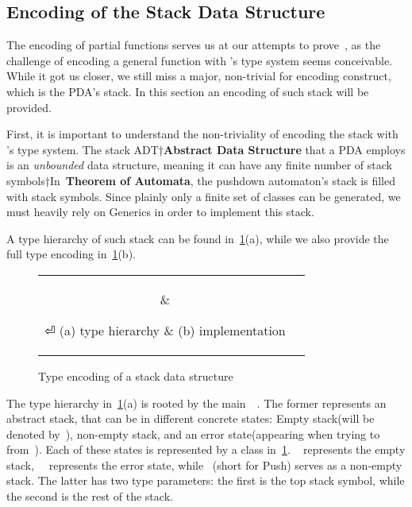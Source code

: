 \subsection{Encoding of the Stack Data Structure}
The encoding of partial functions serves us at our attempts to prove~,
  as the challenge of encoding a general function with \Java's type system seems conceivable.
While it got us closer, we still miss a major, non-trivial for encoding construct, 
  which is the PDA's stack.
In this section an encoding of such stack will be provided.

First, it is important to understand the non-triviality of encoding the stack with \Java's type system.
  The stack ADT†{\textbf{Abstract Data Structure}} that a PDA employs is an \emph{unbounded} data structure,
  meaning it can have any finite number of stack symbols†{In~\textbf{Theorem of Automata}, the pushdown automaton's stack is filled with stack symbols}.
Since plainly only a finite set of \Java classes can be generated, we must heavily rely on \Java Generics in order to
  implement this stack.

A type hierarchy of such stack can be found in~\cref{Figure:stack:encoding}(a), 
  while we also provide the full \Java type encoding in~\cref{Figure:stack:encoding}(b).

\begin{figure}[htb]
  \caption{\label{Figure:stack:encoding} Type encoding of a stack data structure} 
    \begin{tabular}{cc}
      \hspace{-12ex}
      \parbox[c]{0.3\linewidth}{%
        
      }
      &
      \hspace{1ex}
      \parbox[c]{0.86\linewidth}{%
      }
⏎
      \hspace{-12ex} (a) type hierarchy & (b) implementation
    \end{tabular}
\end{figure}

The type hierarchy in~\cref{Figure:stack:encoding}(a) is rooted by the main~~.
The former represents an abstract stack, that can be in different concrete states: Empty stack(will be denoted by~),
  non-empty stack, and an error state(appearing when trying to~ from~).
Each of these states is represented by a class in~\cref{Figure:stack:encoding}.
~ represents the empty stack,~~ represents the error state,
  while ~(short for Push) serves as a non-empty stack.
The latter has two type parameters: the first is the top stack symbol, while the second is the rest of the stack.

